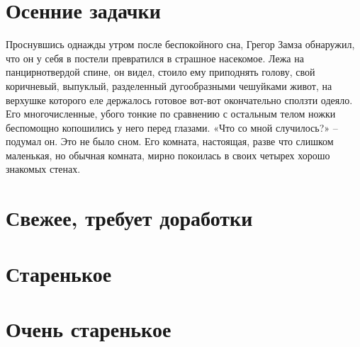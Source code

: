 \chapter{Осенние задачки}

Проснувшись однажды утром после беспокойного сна, Грегор Замза обнаружил, что
он у себя в постели превратился в страшное насекомое. Лежа на панцирнотвердой
спине, он видел, стоило ему приподнять голову, свой коричневый, выпуклый,
разделенный дугообразными чешуйками живот, на верхушке которого еле держалось
готовое вот-вот окончательно сползти одеяло. Его многочисленные, убого тонкие
по сравнению с остальным телом ножки беспомощно копошились у него перед
глазами. «Что со мной случилось?» – подумал он. Это не было сном. Его комната,
настоящая, разве что слишком маленькая, но обычная комната, мирно покоилась в
своих четырех хорошо знакомых стенах.

%
%
%




\chapter{Свежее, требует доработки} %



%

\chapter{Старенькое} %

%





\chapter{Очень старенькое} %

% 







